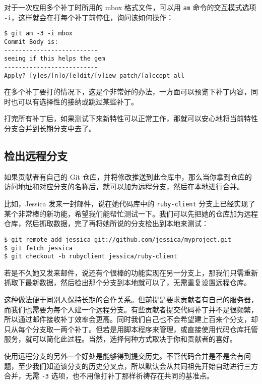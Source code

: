 \documentclass[a4paper]{book}
\begin{document}
对于一次应用多个补丁时所用的 mbox 格式文件，可以用 \texttt{am} 命令的交互模式选项 \texttt{-i}，这样就会在打每个补丁前停住，询问该如何操作：

\begin{shaded}\begin{verbatim}
$ git am -3 -i mbox
Commit Body is:
--------------------------
seeing if this helps the gem
--------------------------
Apply? [y]es/[n]o/[e]dit/[v]iew patch/[a]ccept all 
\end{verbatim}\end{shaded}

在多个补丁要打的情况下，这是个非常好的办法，一方面可以预览下补丁内容，同时也可以有选择性的接纳或跳过某些补丁。

打完所有补丁后，如果测试下来新特性可以正常工作，那就可以安心地将当前特性分支合并到长期分支中去了。

\subsection{检出远程分支}

如果贡献者有自己的 Git 仓库，并将修改推送到此仓库中，那么当你拿到仓库的访问地址和对应分支的名称后，就可以加为远程分支，然后在本地进行合并。

比如，Jessica 发来一封邮件，说在她代码库中的 \texttt{ruby-client} 分支上已经实现了某个非常棒的新功能，希望我们能帮忙测试一下。我们可以先把她的仓库加为远程仓库，然后抓取数据，完了再将她所说的分支检出到本地来测试：

\begin{shaded}\begin{verbatim}
$ git remote add jessica git://github.com/jessica/myproject.git
$ git fetch jessica
$ git checkout -b rubyclient jessica/ruby-client
\end{verbatim}\end{shaded}

若是不久她又发来邮件，说还有个很棒的功能实现在另一分支上，那我们只需重新抓取下最新数据，然后检出那个分支到本地就可以了，无需重复设置远程仓库。

这种做法便于同别人保持长期的合作关系。但前提是要求贡献者有自己的服务器，而我们也需要为每个人建一个远程分支。有些贡献者提交代码补丁并不是很频繁，所以通过邮件接收补丁效率会更高。同时我们自己也不会希望建上百来个分支，却只从每个分支取一两个补丁。但若是用脚本程序来管理，或直接使用代码仓库托管服务，就可以简化此过程。当然，选择何种方式取决于你和贡献者的喜好。

使用远程分支的另外一个好处是能够得到提交历史。不管代码合并是不是会有问题，至少我们知道该分支的历史分叉点，所以默认会从共同祖先开始自动进行三方合并，无需 \texttt{-3} 选项，也不用像打补丁那样祈祷存在共同的基准点。
\end{document}
